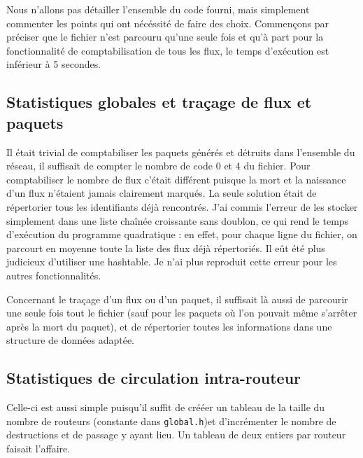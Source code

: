 \documentclass[
10pt, %
a4paper, %
oneside, %
headinclude,footinclude, %
BCOR5mm, %
]{scrartcl}
\begin{document}
Nous n'allons pas détailler l'ensemble du code fourni, mais simplement commenter les points qui ont nécéssité de faire des choix. Commençons par préciser que le fichier n'est parcouru qu'une seule fois et qu'à part pour la fonctionnalité de comptabilisation de tous les flux, le temps d'exécution est inférieur à 5 secondes.



\subsection{Statistiques globales et traçage de flux et paquets}
Il était trivial de comptabiliser les paquets générés et détruits dans l'ensemble du réseau, il suffisait de compter le nombre de code 0 et 4 du fichier.
Pour comptabiliser le nombre de  flux c'était différent puisque la mort et la naissance d'un flux n'étaient jamais clairement marqués. La seule solution était de répertorier tous les identifiants déjà rencontrés. J'ai commis l'erreur de les stocker simplement dans une liste chaînée croissante sans doublon, ce qui rend le temps d'exécution du programme quadratique : en effet, pour chaque ligne du fichier, on parcourt en moyenne toute la liste des flux déjà répertoriés. Il eût été plus judicieux d'utiliser une hashtable. Je n'ai plus reproduit cette erreur pour les autres fonctionnalités.

Concernant le traçage d'un flux ou d'un paquet, il suffisait là aussi de parcourir une seule fois tout le fichier (sauf pour les paquets où l'on pouvait même s'arrêter après la mort du paquet), et de répertorier toutes les informations dans une structure de données adaptée.

\subsection{Statistiques de circulation intra-routeur}
Celle-ci est aussi simple puisqu'il suffit de crééer un tableau de la taille du nombre de routeurs (constante dans \texttt{global.h})et d'incrémenter le nombre de destructions et de passage y ayant lieu. Un tableau de deux entiers par routeur faisait l'affaire.
\end{document}

